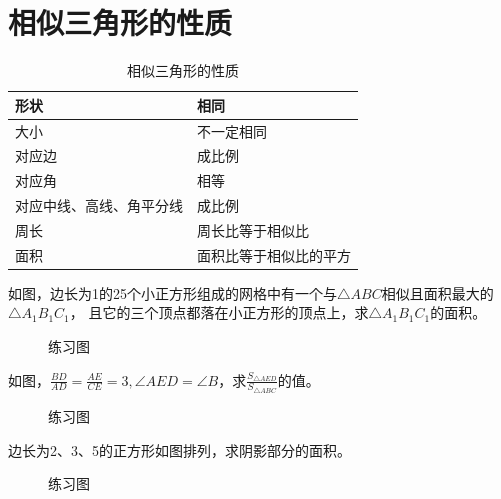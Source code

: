 \section{相似三角形的性质}
\begin{table}[H]
    \centering
    \caption{相似三角形的性质}
    \begin{tabular}{l|p{8cm}}
        \hline
        \hline
        形状           & 相同          \\
        \hline
        大小           & 不一定相同       \\
        \hline
        对应边          & 成比例         \\
        \hline
        对应角          & 相等          \\
        \hline
        对应中线、高线、角平分线 & 成比例         \\
        \hline
        周长           & 周长比等于相似比    \\
        \hline
        面积           & 面积比等于相似比的平方 \\
        \hline
        \hline
    \end{tabular}
\end{table}
\begin{problem}
如图，边长为1的25个小正方形组成的网格中有一个与$\triangle ABC$相似且面积最大的$\triangle A_1B_1C_1$，
且它的三个顶点都落在小正方形的顶点上，求$\triangle A_1B_1C_1$的面积。
\end{problem}
\begin{figure}[H]
    \centering
    \resizebox{4cm}{!}{}
    \caption{练习图}
\end{figure}
\begin{problem}
如图，$\frac{BD}{AD}=\frac{AE}{CE}=3,\angle AED=\angle B$，求$\frac{S_{\triangle AED}}{S_{\triangle ABC}}$的值。\\
\end{problem}
\begin{figure}[H]
    \centering
    \resizebox{4cm}{!}{}
    \caption{练习图}
\end{figure}
\begin{problem}
边长为2、3、5的正方形如图排列，求阴影部分的面积。
\end{problem}
\begin{figure}[H]
    \centering
    \resizebox{4cm}{!}{}
    \caption{练习图}
\end{figure}
